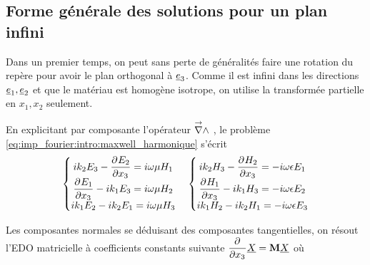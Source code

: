 
\subsection{Forme générale des solutions pour un plan infini}



Dans un premier temps, on peut sans perte de généralités faire une rotation du repère pour avoir le plan orthogonal à $\v e_3$. Comme il est infini dans les directions $\v e_1, \v e_2$ et que le matériau est homogène isotrope, on utilise la transformée partielle en $x_1, x_2$ seulement.

\renewcommand{\x}{e_1}
\renewcommand{\y}{e_2}
\renewcommand{\z}{e_3}
\renewcommand{\peps}{\eps}
\renewcommand{\pmu}{{\mu}}
\begin{figure}[h!]
\centering
\begin{tikzpicture}

\end{tikzpicture}
\end{figure}

En explicitant par composante l'opérateur $\vrot$ , le problème \eqref{eq:imp_fourier:intro:maxwell_harmonique} s'écrit  
\begin{align*}
    \left\lbrace 
    \begin{matrix}
    ik_2 E_3  - \ddr{x_3}{E_ 2} = i \w \mu H_1 \\
    \ddr{x_3}{E_1} - ik_1 E_3 = i\w \mu H_2 \\
    ik_1 E_2 - ik_2 E_1 = i\w \mu H_3 \\
    \end{matrix}
    \right. \quad 
    \left\lbrace 
    \begin{matrix}
    ik_2 H_3  - \ddr{x_3}{H_ 2} = -i \w \eps E_1 \\
    \ddr{x_3}{H_1} - ik_1 H_3 = -i\w \eps E_2 \\
    ik_1 H_2 - ik_2 H_1 = -i\w \eps E_3 \\
    \end{matrix}
    \right.
\end{align*}

Les composantes normales se déduisant des composantes tangentielles, on résout l'EDO matricielle à coefficients constants 
suivante $\ddr{x_3}{}\v{X} = \mat{M} \v{X}$ où

